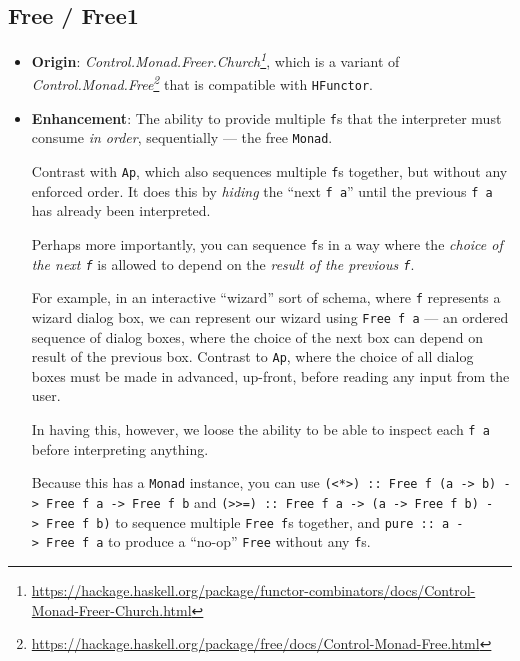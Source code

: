 \documentclass[]{article}
\renewcommand{\href}[2]{#2\footnote{\url{#1}}}
\begin{document}
\hypertarget{free-free1}{%
\subsection{Free / Free1}\label{free-free1}}

\begin{itemize}
\item
  \textbf{Origin}:
  \emph{\href{https://hackage.haskell.org/package/functor-combinators/docs/Control-Monad-Freer-Church.html}{Control.Monad.Freer.Church}},
  which is a variant of
  \emph{\href{https://hackage.haskell.org/package/free/docs/Control-Monad-Free.html}{Control.Monad.Free}}
  that is compatible with \texttt{HFunctor}.
\item
  \textbf{Enhancement}: The ability to provide multiple \texttt{f}s that the
  interpreter must consume \emph{in order}, sequentially --- the free
  \texttt{Monad}.

  Contrast with \texttt{Ap}, which also sequences multiple \texttt{f}s together,
  but without any enforced order. It does this by \emph{hiding} the ``next
  \texttt{f\ a}'' until the previous \texttt{f\ a} has already been interpreted.

  Perhaps more importantly, you can sequence \texttt{f}s in a way where the
  \emph{choice of the next \texttt{f}} is allowed to depend on the \emph{result
  of the previous \texttt{f}}.

  For example, in an interactive ``wizard'' sort of schema, where \texttt{f}
  represents a wizard dialog box, we can represent our wizard using
  \texttt{Free\ f\ a} --- an ordered sequence of dialog boxes, where the choice
  of the next box can depend on result of the previous box. Contrast to
  \texttt{Ap}, where the choice of all dialog boxes must be made in advanced,
  up-front, before reading any input from the user.

  In having this, however, we loose the ability to be able to inspect each
  \texttt{f\ a} before interpreting anything.

  Because this has a \texttt{Monad} instance, you can use
  \texttt{(\textless{}*\textgreater{})\ ::\ Free\ f\ (a\ -\textgreater{}\ b)\ -\textgreater{}\ Free\ f\ a\ -\textgreater{}\ Free\ f\ b}
  and
  \texttt{(\textgreater{}\textgreater{}=)\ ::\ Free\ f\ a\ -\textgreater{}\ (a\ -\textgreater{}\ Free\ f\ b)\ -\textgreater{}\ Free\ f\ b)}
  to sequence multiple \texttt{Free\ f}s together, and
  \texttt{pure\ ::\ a\ -\textgreater{}\ Free\ f\ a} to produce a ``no-op''
  \texttt{Free} without any \texttt{f}s.


\end{itemize}
\end{document}

